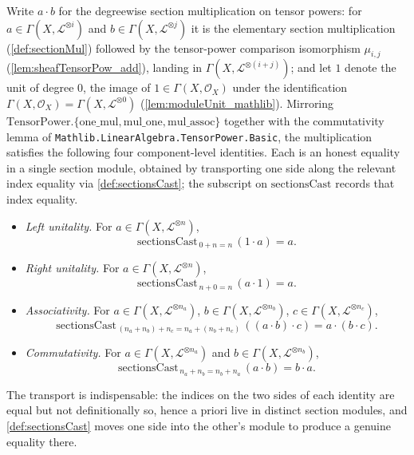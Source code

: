 \begin{lemma}
  \label{lem:sectionMul_coherent}
  Write \(a \cdot b\) for the degreewise section multiplication on tensor powers:
  for \(a \in \Gamma(X, \mathcal{L}^{\otimes i})\) and
  \(b \in \Gamma(X, \mathcal{L}^{\otimes j})\) it is the elementary section
  multiplication (\cref{def:sectionMul}) followed by the tensor-power comparison
  isomorphism \(\mu_{i,j}\) (\cref{lem:sheafTensorPow_add}), landing in
  \(\Gamma(X, \mathcal{L}^{\otimes (i+j)})\); and let \(1\) denote the unit of
  degree \(0\), the image of \(1 \in \Gamma(X,\mathcal{O}_X)\) under the
  identification \(\Gamma(X,\mathcal{O}_X) = \Gamma(X, \mathcal{L}^{\otimes 0})\)
  (\cref{lem:moduleUnit_mathlib}). Mirroring
  \(\mathrm{TensorPower.\{one\_mul, mul\_one, mul\_assoc\}}\) together with the
  commutativity lemma of \texttt{Mathlib.LinearAlgebra.TensorPower.Basic}, the
  multiplication satisfies the following four component-level identities. Each is
  an honest equality in a single section module, obtained by transporting one side
  along the relevant index equality via \cref{def:sectionsCast}; the subscript on
  \(\mathrm{sectionsCast}\) records that index equality.
  \begin{itemize}
    \item \emph{Left unitality.} For \(a \in \Gamma(X, \mathcal{L}^{\otimes n})\),
      \[
        \mathrm{sectionsCast}_{\,0+n=n}\,(1 \cdot a) = a .
      \]
    \item \emph{Right unitality.} For \(a \in \Gamma(X, \mathcal{L}^{\otimes n})\),
      \[
        \mathrm{sectionsCast}_{\,n+0=n}\,(a \cdot 1) = a .
      \]
    \item \emph{Associativity.} For
      \(a \in \Gamma(X, \mathcal{L}^{\otimes n_a})\),
      \(b \in \Gamma(X, \mathcal{L}^{\otimes n_b})\),
      \(c \in \Gamma(X, \mathcal{L}^{\otimes n_c})\),
      \[
        \mathrm{sectionsCast}_{\,(n_a+n_b)+n_c = n_a+(n_b+n_c)}\,
          ((a \cdot b) \cdot c) = a \cdot (b \cdot c) .
      \]
    \item \emph{Commutativity.} For
      \(a \in \Gamma(X, \mathcal{L}^{\otimes n_a})\) and
      \(b \in \Gamma(X, \mathcal{L}^{\otimes n_b})\),
      \[
        \mathrm{sectionsCast}_{\,n_a+n_b = n_b+n_a}\,(a \cdot b) = b \cdot a .
      \]
  \end{itemize}
  The transport is indispensable: the indices on the two sides of each identity
  are equal but not definitionally so, hence a priori live in distinct section
  modules, and \cref{def:sectionsCast} moves one side into the other's module to
  produce a genuine equality there.
\end{lemma}

